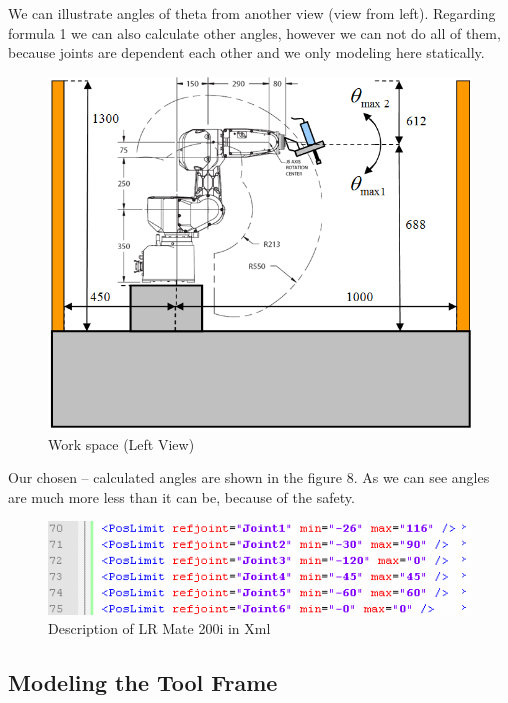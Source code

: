 We can illustrate angles of theta from another view (view from left). Regarding formula 1 we can also calculate other angles, however we can not do all of them, because joints are dependent each other and we only modeling here statically. 

\begin{figure}[H]
  \centering
  \includegraphics[scale= 0.6]{source/JointWorkspace.png}
  \caption{Work space (Left View)}
  \label{fig:JointWorkspace}
\end{figure}

Our chosen – calculated angles are shown in the figure 8. As we can see angles are much more less than it can be, because of the safety. 

\begin{figure}[H]
  \centering
  \includegraphics[scale= 0.8]{source/angleXML.png}
  \caption{Description of LR Mate 200i in Xml}
  \label{fig:angleXML}
\end{figure}

\subsection {Modeling the Tool Frame}

